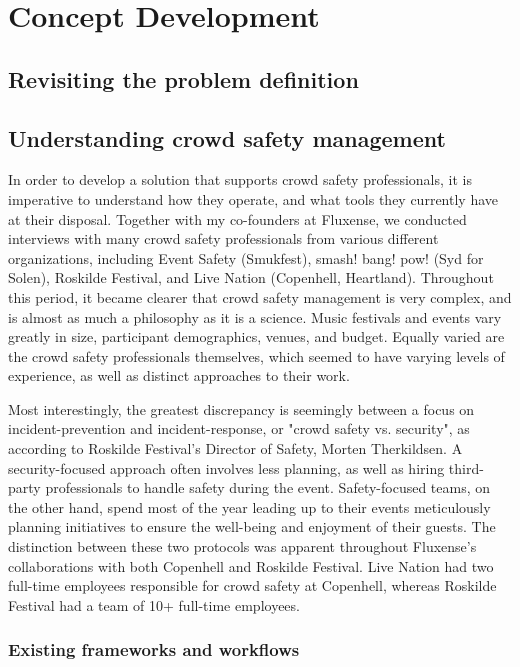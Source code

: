 \chapter{Concept Development}
\label{chap:concept-development}

\section{Revisiting the problem definition}



\section{Understanding crowd safety management}
\label{sec:crowd-safety}

In order to develop a solution that supports crowd safety professionals, it is imperative to understand how they operate, and what tools they currently have at their disposal. Together with my co-founders at Fluxense, we conducted interviews with many crowd safety professionals from various different organizations, including Event Safety (Smukfest), smash! bang! pow! (Syd for Solen), Roskilde Festival, and Live Nation (Copenhell, Heartland). Throughout this period, it became clearer that crowd safety management is very complex, and is almost as much a philosophy as it is a science. Music festivals and events vary greatly in size, participant demographics, venues, and budget. Equally varied are the crowd safety professionals themselves, which seemed to have varying levels of experience, as well as distinct approaches to their work.

Most interestingly, the greatest discrepancy is seemingly between a focus on incident-prevention and incident-response, or "crowd safety vs. security", as according to Roskilde Festival's Director of Safety, Morten Therkildsen. A security-focused approach often involves less planning, as well as hiring third-party professionals to handle safety during the event. Safety-focused teams, on the other hand, spend most of the year leading up to their events meticulously planning initiatives to ensure the well-being and enjoyment of their guests. The distinction between these two protocols was apparent throughout Fluxense's collaborations with both Copenhell and Roskilde Festival. Live Nation had two full-time employees responsible for crowd safety at Copenhell, whereas Roskilde Festival had a team of 10+ full-time employees.

\subsection{Existing frameworks and workflows}

